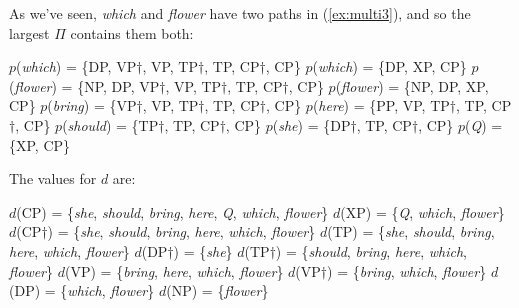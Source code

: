 \documentclass[output=paper]{langsci/langscibook}
\begin{document}
%

As we've seen, \emph{which} and \emph{flower} have two paths in (\ref{ex:multi3}), and so the largest $\Pi$ contains them both:
\begin{exe}
	\ex \label{ex:bigpimulti3}
	\begin{xlist}
		\ex $p$(\emph{which}) = \{DP, VP$\dag$, VP, TP$\dag$, TP, CP$\dag$, CP\}
		\ex $p$(\emph{which}) = \{DP, XP, CP\}
		\ex $p$(\emph{flower}) = \{NP, DP, VP$\dag$, VP, TP$\dag$, TP, CP$\dag$, CP\}
		\ex $p$(\emph{flower}) = \{NP, DP, XP, CP\}
		\ex $p$(\emph{bring}) = \{VP$\dag$, VP, TP$\dag$, TP, CP$\dag$, CP\}
		\ex $p$(\emph{here}) = \{PP, VP, TP$\dag$, TP, CP$\dag$, CP\}
		\ex $p$(\emph{should}) = \{TP$\dag$, TP, CP$\dag$, CP\}
		\ex $p$(\emph{she}) = \{DP$\dag$, TP, CP$\dag$, CP\}
		\ex $p$(\emph{Q}) = \{XP, CP\}
	\end{xlist}
\end{exe}

\newpage
The values for $d$ are:
\begin{exe}
	\ex \label{ex:bigdmulti3}
	\begin{xlist}
		\ex $d$(CP) = \{\emph{she}, \emph{should}, \emph{bring}, \emph{here}, \emph{Q}, \emph{which}, \emph{flower}\}
		\ex \label{ex:bdmulti3xp}$d$(XP) = \{\emph{Q}, \emph{which}, \emph{flower}\}
		\ex $d$(CP$\dag$) = \{\emph{she}, \emph{should}, \emph{bring}, \emph{here}, \emph{which}, \emph{flower}\}
		\ex $d$(TP) = \{\emph{she}, \emph{should}, \emph{bring}, \emph{here}, \emph{which}, \emph{flower}\}
		\ex $d$(DP$\dag$) = \{\emph{she}\}
		\ex $d$(TP$\dag$) = \{\emph{should}, \emph{bring}, \emph{here}, \emph{which}, \emph{flower}\}
		\ex \label{ex:vp} $d$(VP) = \{\emph{bring}, \emph{here}, \emph{which}, \emph{flower}\}
		\ex \label{ex:vpdag}$d$(VP$\dag$) = \{\emph{bring}, \emph{which}, \emph{flower}\}
		\ex $d$(DP) = \{\emph{which}, \emph{flower}\}
		\ex $d$(NP) = \{\emph{flower}\}
	\end{xlist}
\end{exe}
\end{document}
